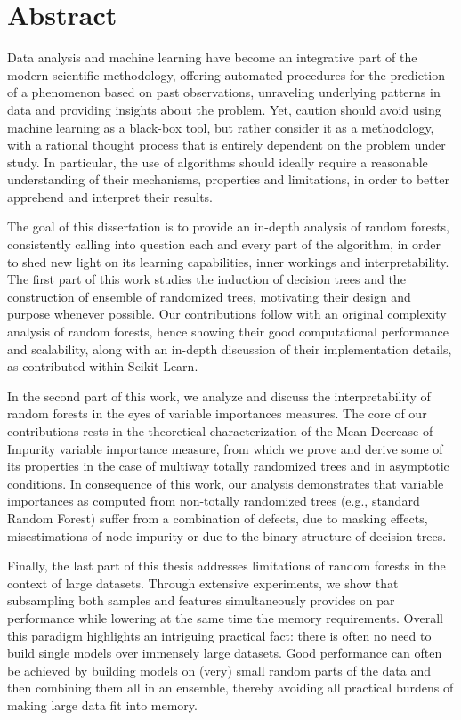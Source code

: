 
\chapter*{Abstract}

Data analysis and machine learning have become an integrative part of the
modern scientific methodology, offering automated procedures for the prediction
of a phenomenon based on past observations, unraveling underlying patterns in
data and providing insights about the problem. Yet, caution should
avoid using machine learning as a black-box tool, but rather consider it as a
methodology, with a rational thought process that is entirely dependent on the
problem under study. In particular, the use of algorithms
should ideally require a reasonable understanding of their
mechanisms, properties and limitations, in order to better apprehend and
interpret their results.

The goal of this dissertation is to provide an in-depth
analysis of random forests, consistently calling into
question each and every part of the algorithm, in order to shed new light on
its learning capabilities, inner workings and interpretability. The first
part of this work studies the induction of decision trees and the construction of
ensemble of randomized trees, motivating their design and purpose whenever
possible. Our contributions follow with an original complexity
analysis of random forests, hence showing their good computational performance
and scalability, along with an in-depth discussion of their
implementation details, as contributed within Scikit-Learn.

In the second part of this work, we analyze and discuss the interpretability of
random forests in the eyes of variable importances measures. The core of our
contributions rests in the theoretical characterization of the Mean Decrease of
Impurity variable importance measure, from which we prove and derive some of
its properties in the case of multiway totally randomized trees and in
asymptotic conditions. In consequence of this work, our analysis  demonstrates
that variable importances as computed from non-totally randomized trees (e.g.,
standard Random Forest) suffer from a combination of defects, due to masking
effects, misestimations of node impurity or due to the binary structure of
decision trees.

Finally, the last part of this thesis addresses limitations of random forests
in the context of large datasets. Through extensive experiments, we show
that subsampling both samples and features simultaneously provides on
par performance while lowering at the same time the memory requirements.
Overall this paradigm highlights an intriguing practical fact: there is often
no need to build single models over immensely large datasets. Good performance
can often be achieved by building models on (very) small random parts of the
data and then combining them all in an ensemble, thereby avoiding all practical burdens of making large data fit into memory.
